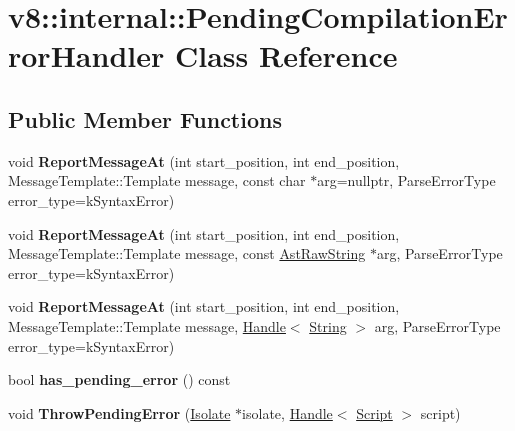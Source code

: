 \hypertarget{classv8_1_1internal_1_1_pending_compilation_error_handler}{}\section{v8\+:\+:internal\+:\+:Pending\+Compilation\+Error\+Handler Class Reference}
\label{classv8_1_1internal_1_1_pending_compilation_error_handler}
\subsection*{Public Member Functions}
\begin{DoxyCompactItemize}
\item 
void {\bfseries Report\+Message\+At} (int start\+\_\+position, int end\+\_\+position, Message\+Template\+::\+Template message, const char $\ast$arg=nullptr, Parse\+Error\+Type error\+\_\+type=k\+Syntax\+Error)\hypertarget{classv8_1_1internal_1_1_pending_compilation_error_handler_a1b2c6f9bc901190e1fc569a3ea013fce}{}\label{classv8_1_1internal_1_1_pending_compilation_error_handler_a1b2c6f9bc901190e1fc569a3ea013fce}

\item 
void {\bfseries Report\+Message\+At} (int start\+\_\+position, int end\+\_\+position, Message\+Template\+::\+Template message, const \hyperlink{classv8_1_1internal_1_1_ast_raw_string}{Ast\+Raw\+String} $\ast$arg, Parse\+Error\+Type error\+\_\+type=k\+Syntax\+Error)\hypertarget{classv8_1_1internal_1_1_pending_compilation_error_handler_ab6e2534ec3e0f5fbea8a15f9016686a4}{}\label{classv8_1_1internal_1_1_pending_compilation_error_handler_ab6e2534ec3e0f5fbea8a15f9016686a4}

\item 
void {\bfseries Report\+Message\+At} (int start\+\_\+position, int end\+\_\+position, Message\+Template\+::\+Template message, \hyperlink{classv8_1_1internal_1_1_handle}{Handle}$<$ \hyperlink{classv8_1_1internal_1_1_string}{String} $>$ arg, Parse\+Error\+Type error\+\_\+type=k\+Syntax\+Error)\hypertarget{classv8_1_1internal_1_1_pending_compilation_error_handler_ab480eb54641003eae6bca9d240d534d7}{}\label{classv8_1_1internal_1_1_pending_compilation_error_handler_ab480eb54641003eae6bca9d240d534d7}

\item 
bool {\bfseries has\+\_\+pending\+\_\+error} () const \hypertarget{classv8_1_1internal_1_1_pending_compilation_error_handler_aa626b6d9c69ffddd191d4e2c67ca28a9}{}\label{classv8_1_1internal_1_1_pending_compilation_error_handler_aa626b6d9c69ffddd191d4e2c67ca28a9}

\item 
void {\bfseries Throw\+Pending\+Error} (\hyperlink{classv8_1_1internal_1_1_isolate}{Isolate} $\ast$isolate, \hyperlink{classv8_1_1internal_1_1_handle}{Handle}$<$ \hyperlink{classv8_1_1internal_1_1_script}{Script} $>$ script)\hypertarget{classv8_1_1internal_1_1_pending_compilation_error_handler_a28f115daab92d67289304b3c48c9fcda}{}\label{classv8_1_1internal_1_1_pending_compilation_error_handler_a28f115daab92d67289304b3c48c9fcda}

\end{DoxyCompactItemize}
